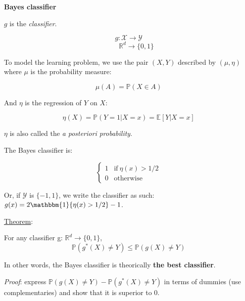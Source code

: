 {\fontsize{12pt}{22pt} \textbf{Bayes classifier}\par}

\vspace{5mm}

$g$ is the \textit{classifier}.

$$g: \mathcal{X} \to \mathcal{Y}$$
$$~~~~~~~~~~\mathbb{R}^d \to \{0,1\}$$

To model the learning problem, we use the pair $(X,Y)$ described by $(\mu, \eta)$ where $\mu$ is the probability measure:

$$\mu(A) = \mathbb{P}(X \in A)$$

And $\eta$ is the regression of $Y$ on $X$:

$$\eta(X) = \mathbb{P}(Y=1 | X=x) = \mathbb{E}[Y | X=x]$$

$\eta$ is also called the \textit{a posteriori probability}.

The Bayes classifier is:

  \begin{equation}
    \begin{cases}
      1 & \text{if}\ \eta(x) > 1/2 \\
      0 & \text{otherwise}
    \end{cases}
  \end{equation}

Or, if $\mathcal{Y}$ is $\{-1,1\}$, we write the classifier as such: $g(x) = 2 \mathbbm{1}\{ \eta(x)>1/2\}-1$.

\vspace{5mm}

\underline{Theorem}:

\vspace{5mm}

For any classifier g: $\mathbb{R}^d \to \{0,1\}$,
$$\mathbb{P}(g^*(X) \neq Y) \le \mathbb{P}(g(X) \neq Y)$$

In other words, the Bayes classifier is theorically \textbf{the best classifier}.

\vspace{5mm}

\textit{Proof}: express $\mathbb{P}(g(X) \neq Y) - \mathbb{P}(g^*(X) \neq Y)$ in terms of dummies (use complementaries) and show that it is superior to 0.

\vspace{5mm}
